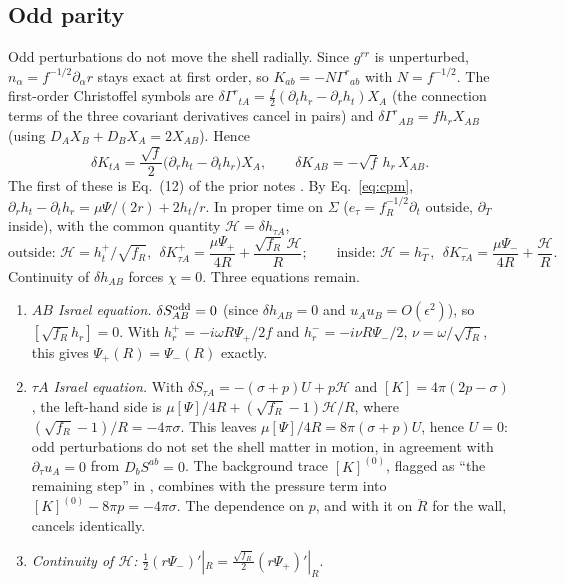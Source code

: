 \documentclass[11pt,a4paper]{article}
\numberwithin{equation}{section}
\newcommand{\sq}{\sqrt{f_R}}
\begin{document}
\subsection{Odd parity}\label{sec:odd}
Odd perturbations do not move the shell radially. Since $g^{rr}$ is unperturbed, $n_\alpha=f^{-1/2}\partial_\alpha r$
stays exact at first order, so $K_{ab}=-N\Gamma^r{}_{ab}$ with $N=f^{-1/2}$. The first-order Christoffel symbols
are $\delta\Gamma^r{}_{tA}=\tfrac f2(\partial_th_r-\partial_rh_t)X_A$ (the connection terms of the three covariant
derivatives cancel in pairs) and $\delta\Gamma^r{}_{AB}=fh_rX_{AB}$ (using $D_AX_B+D_BX_A=2X_{AB}$). Hence
\begin{equation}
\delta K_{tA}=\frac{\sqrt f}{2}\big(\partial_rh_t-\partial_th_r\big)X_A,\qquad \delta K_{AB}=-\sqrt f\,h_r\,X_{AB}.
\label{eq:dKodd}
\end{equation}
The first of these is Eq.~(12) of the prior notes \cite{burbuja}. By Eq.~\eqref{eq:cpm},
$\partial_rh_t-\partial_th_r=\mu\Psi/(2r)+2h_t/r$. In proper time on $\Sigma$ ($e_\tau=f_R^{-1/2}\partial_t$ outside,
$\partial_T$ inside), with the common quantity $\mathcal H=\delta h_{\tau A}$,
\begin{equation}
\text{outside: }\mathcal H=h_t^+/\sq,\ \ \delta K^+_{\tau A}=\frac{\mu\Psi_+}{4R}+\frac{\sq\,\mathcal H}{R};\qquad
\text{inside: }\mathcal H=h_T^-,\ \ \delta K^-_{\tau A}=\frac{\mu\Psi_-}{4R}+\frac{\mathcal H}{R}.
\end{equation}
Continuity of $\delta h_{AB}$ forces $\chi=0$. Three equations remain.
\begin{enumerate}
\item \emph{$AB$ Israel equation.} $\delta S^{\rm odd}_{AB}=0$ (since $\delta h_{AB}=0$ and $u_Au_B=O(\epsilon^2)$),
so $[\sq h_r]=0$. With $h_r^+=-i\omega R\Psi_+/2f$ and $h_r^-=-i\nu R\Psi_-/2$, $\nu=\omega/\sq$, this gives
$\Psi_+(R)=\Psi_-(R)$ exactly.
\item \emph{$\tau A$ Israel equation.} With $\delta S_{\tau A}=-(\sigma+p)U+p\mathcal H$ and $[K]=4\pi(2p-\sigma)$, the
left-hand side is $\mu[\Psi]/4R+(\sq-1)\mathcal H/R$, where $(\sq-1)/R=-4\pi\sigma$. This leaves
$\mu[\Psi]/4R=8\pi(\sigma+p)U$, hence $U=0$: odd perturbations do not set the shell matter in motion, in agreement
with $\partial_\tau u_A=0$ from $D_bS^{ab}=0$. The background trace $[K]^{(0)}$, flagged as ``the remaining step'' in
\cite{burbuja}, combines with the pressure term into $[K]^{(0)}-8\pi p=-4\pi\sigma$. The dependence on $p$, and with
it on $\ddot R$ for the wall, cancels identically.
\item \emph{Continuity of $\mathcal H$:} $\tfrac12(r\Psi_-)'|_R=\tfrac{\sq}2(r\Psi_+)'|_R$.
\end{enumerate}
\end{document}
